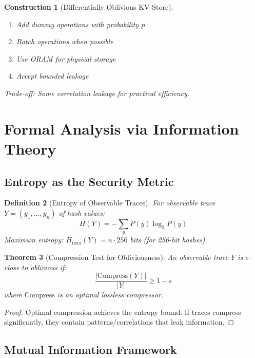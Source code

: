 \documentclass[11pt,final,hidelinks]{article}
\newtheorem{theorem}{Theorem}[section]
\newtheorem{definition}[theorem]{Definition}
\newtheorem{construction}[theorem]{Construction}
\begin{document}
\begin{construction}[Differentially Oblivious KV Store]
\begin{enumerate}
    \item Add dummy operations with probability $p$
    \item Batch operations when possible
    \item Use ORAM for physical storage
    \item Accept bounded leakage
\end{enumerate}
Trade-off: Some correlation leakage for practical efficiency.
\end{construction}

\section{Formal Analysis via Information Theory}

\subsection{Entropy as the Security Metric}

\begin{definition}[Entropy of Observable Traces]
For observable trace $Y = (y_1, \ldots, y_n)$ of hash values:
\begin{equation}
H(Y) = -\sum_{y} P(y) \log_2 P(y)
\end{equation}
Maximum entropy: $H_{\max}(Y) = n \cdot 256$ bits (for 256-bit hashes).
\end{definition}

\begin{theorem}[Compression Test for Obliviousness]
An observable trace $Y$ is $\epsilon$-close to oblivious if:
\begin{equation}
\frac{|\text{Compress}(Y)|}{|Y|} \geq 1 - \epsilon
\end{equation}
where $\text{Compress}$ is an optimal lossless compressor.
\end{theorem}

\begin{proof}
Optimal compression achieves the entropy bound. If traces compress significantly, they contain patterns/correlations that leak information.
\end{proof}

\subsection{Mutual Information Framework}
\end{document}
